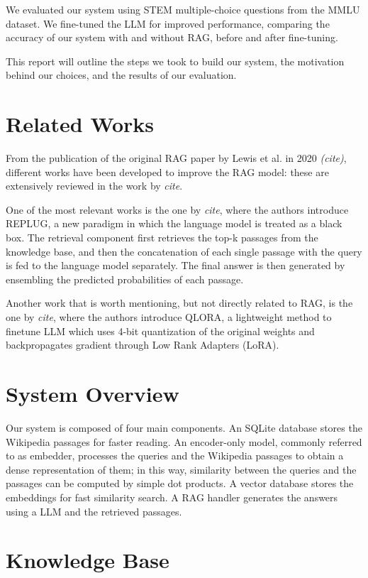\documentclass[11pt]{article}
\begin{document}
We evaluated our system using STEM multiple-choice questions from the MMLU
dataset. We fine-tuned the LLM for improved performance, comparing the accuracy
of our system with and without RAG, before and after fine-tuning.

This report will outline the steps we took to build our system, the motivation
behind our choices, and the results of our evaluation. 

\section{Related Works}

From the publication of the original RAG paper by Lewis et al. in 2020 \textit{(cite)},
different works have been developed to improve the RAG model: these are extensively
reviewed in the work by \textit{cite}.

One of the most relevant works is the one by \textit{cite}, where the authors
introduce REPLUG, a new paradigm in which the language model is treated as a
black box. The retrieval component first retrieves the top-k passages from the
knowledge base, and then the concatenation of each single passage with the
query is fed to the language model separately. The final answer is then generated
by ensembling the predicted probabilities of each passage.

Another work that is worth mentioning, but not directly related to RAG, is the
one by \textit{cite}, where the authors introduce QLORA, a lightweight method 
to finetune LLM which uses 4-bit quantization of the original weights and backpropagates   
gradient through Low Rank Adapters (LoRA).

\section{System Overview}
Our system is composed of four main components.
An SQLite database stores the Wikipedia passages for faster reading.
An encoder-only model, commonly referred to as embedder, processes the queries and the 
Wikipedia passages to obtain a dense representation of them; in this way, similarity 
between the queries and the passages can be computed by simple dot products.
A vector database stores the embeddings for fast similarity search.
A RAG handler generates the answers using a LLM and the retrieved passages.

\section{Knowledge Base}
\end{document}
